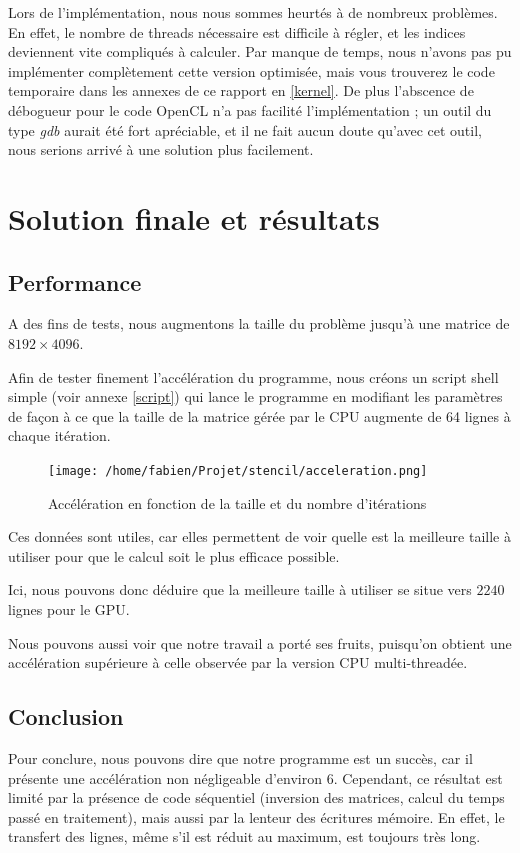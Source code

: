 \documentclass{article}
\begin{document}
Lors de l'implémentation, nous nous sommes heurtés à de nombreux problèmes. En effet, le nombre de threads nécessaire est difficile à régler, et les indices deviennent vite compliqués à calculer.
Par manque de temps, nous n'avons pas pu implémenter complètement cette version optimisée, mais vous trouverez le code temporaire dans les annexes de ce rapport en \ref{kernel}.
De plus l'abscence de débogueur pour le code OpenCL n'a pas facilité l'implémentation ; un outil du type \textit{gdb} aurait été fort apréciable, et il ne fait aucun doute qu'avec cet outil, nous serions arrivé à une solution plus facilement.

\section{Solution finale et résultats}
\subsection{Performance}
A des fins de tests, nous augmentons la taille du problème jusqu'à une matrice de $8192\times4096$.

Afin de tester finement l'accélération du programme, nous créons un script shell simple (voir annexe \ref{script}) qui lance le programme en modifiant les paramètres de façon à ce que la taille de la matrice gérée par le CPU augmente de 64 lignes à chaque itération.

\begin{figure}[htp]
\texttt{[image: /home/fabien/Projet/stencil/acceleration.png]}
\caption{Accélération en fonction de la taille et du nombre d'itérations}
\label{acceleration}
\end{figure}

Ces données sont utiles, car elles permettent de voir quelle est la meilleure taille à utiliser pour que le calcul soit le plus efficace possible.

Ici, nous pouvons donc déduire que la meilleure taille à utiliser se situe vers $2240$ lignes pour le GPU.

Nous pouvons aussi voir que notre travail a porté ses fruits, puisqu'on obtient une accélération supérieure à celle observée par la version CPU multi-threadée.

\subsection{Conclusion}
Pour conclure, nous pouvons dire que notre programme est un succès, car il présente une accélération non négligeable d'environ 6. 
Cependant, ce résultat est limité par la présence de code séquentiel (inversion des matrices, calcul du temps passé en traitement), mais aussi par la lenteur des écritures mémoire. En effet, le transfert des lignes, même s'il est réduit au maximum, est toujours très long.
\end{document}
